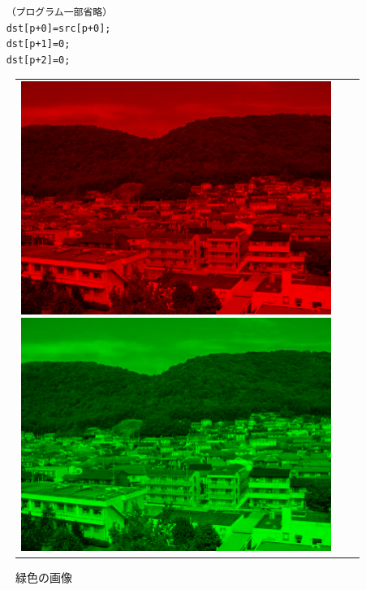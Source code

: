 \documentclass[11pt]{jarticle}
\begin{document}
\begin{verbatim}
    （プログラム一部省略）
    dst[p+0]=src[p+0];
    dst[p+1]=0;
    dst[p+2]=0;
\end{verbatim}
\begin{figure}[htbp]
    \begin{tabular}{ccc}
        \begin{minipage}{0.33\hsize}
            \begin{center}
                \includegraphics[scale=.3]{1-4.png}
                \caption{赤色の画像}
            \end{center}
        \end{minipage}
        \begin{minipage}{0.33\hsize}
            \begin{center}
                \includegraphics[scale=.3]{1-4-1.png}
                \caption{緑色の画像}
            \end{center}
        \end{minipage}
        \begin{minipage}{0.33\hsize}
            \begin{center}

\end{center}
\end{minipage}
\end{tabular}
\end{figure}
\end{document}
